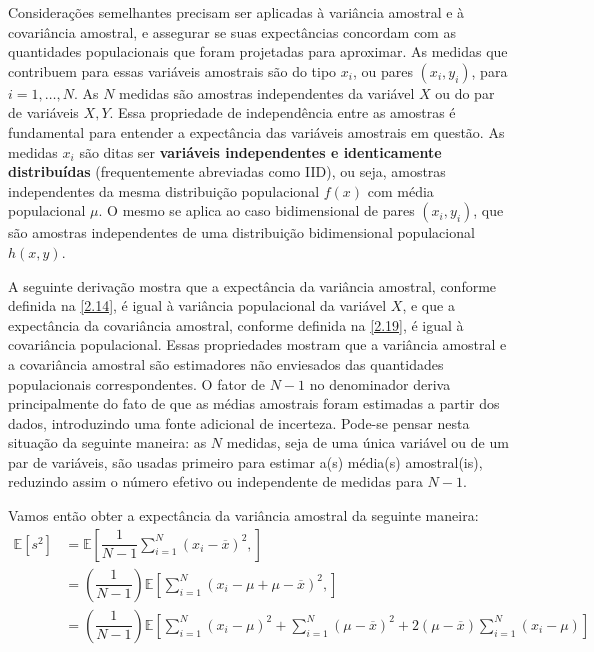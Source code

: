 Considerações semelhantes precisam ser aplicadas à variância amostral e à covariância amostral, e assegurar se suas expectâncias concordam com as quantidades populacionais que foram projetadas para aproximar. As medidas que contribuem para essas variáveis amostrais são do tipo $x_i$, ou pares $(x_i, y_i)$, para $i = 1, \ldots, N$. As $N$ medidas são amostras independentes da variável $X$ ou do par de variáveis $X, Y$. Essa propriedade de independência entre as amostras é fundamental para entender a expectância das variáveis amostrais em questão. As medidas $x_i$ são ditas ser \textbf{variáveis independentes e identicamente distribuídas} (frequentemente abreviadas como IID), ou seja, amostras independentes da mesma distribuição populacional $f(x)$ com média populacional $\mu$. O mesmo se aplica ao caso bidimensional de pares $(x_i, y_i)$, que são amostras independentes de uma distribuição bidimensional populacional $h(x, y)$.

A seguinte derivação mostra que a expectância da variância amostral, conforme definida na \autoref{2.14}, é igual à variância populacional da variável $X$, e que a expectância da covariância amostral, conforme definida na \autoref{2.19}, é igual à covariância populacional. Essas propriedades mostram que a variância amostral e a covariância amostral são estimadores não enviesados das quantidades populacionais correspondentes. O fator de $N - 1$ no denominador deriva principalmente do fato de que as médias amostrais foram estimadas a partir dos dados, introduzindo uma fonte adicional de incerteza. Pode-se pensar nesta situação da seguinte maneira: as $N$ medidas, seja de uma única variável ou de um par de variáveis, são usadas primeiro para estimar a(s) média(s) amostral(is), reduzindo assim o número efetivo ou independente de medidas para $N - 1$.

Vamos então obter a expectância da variância amostral da seguinte maneira:
\begin{align*}
\mathbb{E}[s^2] &= \mathbb{E}\left[\dfrac{1}{N -1} \sum_{i=1}^N (x_i - \overline{x})^2,\right] \\
&= \left(\dfrac{1}{N -1}\right)\mathbb{E}\left[\sum_{i=1}^N (x_i - \mu + \mu - \overline{x})^2,\right] \\
&= \left(\dfrac{1}{N -1}\right)\mathbb{E}\left[\sum_{i=1}^N(x_i - \mu)^2 + \sum_{i=1}^N(\mu - \overline{x})^2 + 2(\mu - \overline{x})\sum_{i=1}^N(x_i - \mu)\right]
\end{align*}

